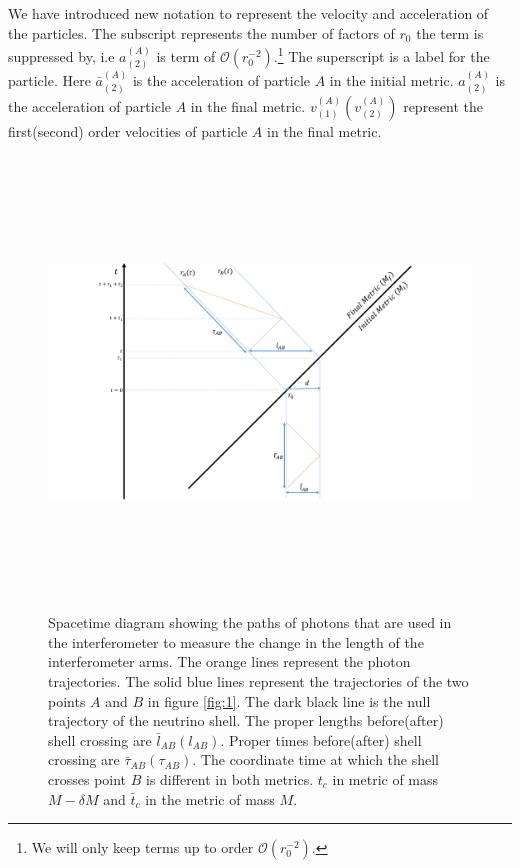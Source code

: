 \documentclass[aps,showpacs,onecolumn,floats,prd,superscriptaddress,nofootinbib]{revtex4-1}
\begin{document}
We have introduced new notation to represent the velocity and acceleration of the particles. The subscript represents the number of factors of $r_0$ the term is suppressed by, i.e $a^{(A)}_{(2)}$ is term of $\mathcal{O}(r_0^{-2})$.\footnote{We will only keep terms up to order $\mathcal{O}(r_0^{-2})$.} The superscript is a label for the particle. Here $\bar{a}^{(A)}_{(2)}$ is the acceleration of particle $A$ in the initial metric. $a^{(A)}_{(2)}$ is the acceleration of particle $A$ in the final metric. $v^{(A)}_{(1)}(v^{(A)}_{(2)})$ represent the first(second) order velocities of particle $A$ in the final metric. 
\begin{figure}[tb!]
\begin{center}
\includegraphics[width =\textwidth, height = 12cm]{calculation.pdf}
\caption{Spacetime diagram showing the paths of photons that are used in the interferometer to measure the change in the length of the interferometer arms. The orange lines represent the photon trajectories. The solid blue lines represent the trajectories of the two points $A$ and $B$ in figure \ref{fig:1}. The dark black line is the null trajectory of the neutrino shell. The proper lengths before(after) shell crossing are $\bar{l}_{AB}(l_{AB})$. Proper times before(after) shell crossing are $\bar{\tau}_{AB}(\tau_{AB})$. The coordinate time at which the shell crosses point $B$ is different in both metrics. $t_c$ in metric of mass $M-\delta M$ and $\bar{t}_c$ in the metric of mass $M$. }
\label{calculation}
\end{center}
\end{figure}
\end{document}
